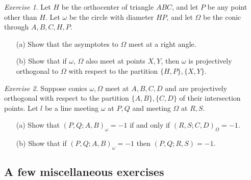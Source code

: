 \documentclass[letterpaper,11pt]{article}
\theoremstyle{definition}
\theoremstyle{remark}
\newtheorem{exer}{Exercise}
\begin{document}
\begin{exer}\label{orthohyperbola} Let $H$ be the orthocenter of triangle $ABC$, and let $P$ be any point other than $H$. Let $\omega$ be the circle with diameter $HP$, and let $\Omega$ be the conic through $A,B,C,H,P$.
\begin{itemize}
\item[(a)] Show that the asymptotes to $\Omega$ meet at a right angle.

\item[(b)] Show that if $\omega$, $\Omega$ also meet at points $X,Y$, then $\omega$ is projectively orthogonal to $\Omega$ with respect to the partition $\{H,P\},\{X,Y\}$.
\end{itemize}
\end{exer}

\begin{exer} Suppose conics $\omega,\Omega$ meet at $A,B,C,D$ and are projectively orthogonal with respect to the partition $\{A,B\},\{C,D\}$ of their intersection points. Let $l$ be a line meeting $\omega$ at $P,Q$ and meeting $\Omega$ at $R,S$.
\begin{itemize}
\item[(a)] Show that $(P,Q;A,B)_\omega = -1$ if and only if $(R,S;C,D)_{\Omega} = -1$.

\item[(b)] Show that if $(P,Q;A,B)_\omega = -1$ then $(P,Q;R,S) = -1$.
\end{itemize}
\end{exer}

\subsection{A few miscellaneous exercises}
\end{document}
